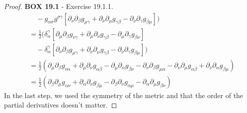 \documentclass[11pt]{article}
\theoremstyle{definition}
\begin{document}
\begin{proof}{\textbf{BOX 19.1} - Exercise 19.1.1.}
\begin{align*}
    &\quad
    - g_{\alpha\sigma}g^{\sigma\gamma}
    [\partial_{\nu}\partial_{\beta}g_{\mu\gamma}
    + \partial_{\nu}\partial_{\mu}g_{\gamma\beta}
    - \partial_{\nu}\partial_{\gamma}g_{\beta\mu}])\\
    &= \frac{1}{2}(
    \delta^\gamma_{\alpha}[\partial_{\mu}\partial_{\beta}g_{\nu\gamma}
    + \partial_{\mu}\partial_{\nu}g_{\gamma\beta}
    - \partial_{\mu}\partial_{\gamma}g_{\beta\nu}]\\
    &\quad
    - \delta^\gamma_{\alpha}[\partial_{\nu}\partial_{\beta}g_{\mu\gamma}
    + \partial_{\nu}\partial_{\mu}g_{\gamma\beta}
    - \partial_{\nu}\partial_{\gamma}g_{\beta\mu}])\\
    &= \frac{1}{2}(
    \partial_{\mu}\partial_{\beta}g_{\nu\alpha}
    + \partial_{\mu}\partial_{\nu}g_{\alpha\beta}
    - \partial_{\mu}\partial_{\alpha}g_{\beta\nu}
    - \partial_{\nu}\partial_{\beta}g_{\mu\alpha}
    - \partial_{\nu}\partial_{\mu}g_{\alpha\beta}
    + \partial_{\nu}\partial_{\alpha}g_{\beta\mu})\\
    &= \frac{1}{2}(
    \partial_{\beta}\partial_{\mu}g_{\alpha\nu}
    + \partial_{\alpha}\partial_{\nu}g_{\beta\mu}
    - \partial_{\beta}\partial_{\nu}g_{\alpha\mu}
    - \partial_{\alpha}\partial_{\mu}g_{\beta\nu})
\end{align*}
In the last step, we used the symmetry of the metric and that the order of
the partial derivatives doesn't matter.
\end{proof}
\end{document}
